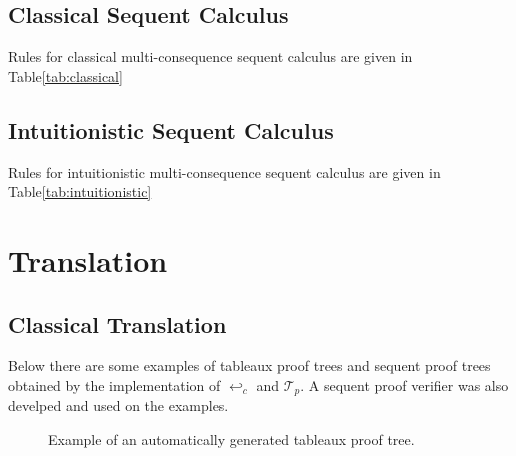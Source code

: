 \documentclass[runningheads]{llncs}
\begin{document}
\subsection {Classical Sequent Calculus}

\developmentSequentClassicalDefinition

Rules for classical multi-consequence sequent calculus are given in Table\ref{tab:classical}

\RulesClassicalSequentCalculus
\subsection {Intuitionistic Sequent Calculus}

\developmentSequentIntuitionisticDefinition

Rules for intuitionistic multi-consequence sequent calculus are given in Table\ref{tab:intuitionistic}


\RulesIntuitionisticSequentCalculus


\section{Translation}

\nodeTranslationFunction

\uselessTheorem

\subsection{Classical Translation}



\localTranslationValidityTheorem
    


\TranslationClassical

\TranslationClassicalProof



Below there are some examples of tableaux proof trees and sequent proof trees obtained by the 
implementation of $\hookleftarrow_c$ and $\mathcal{T}_p$. A 
sequent proof verifier was also develped and used on the examples.


\begin{figure}

    {\fontsize{1}{1}\selectfont
        \ocmalImageII

\caption{Example of an automatically generated tableaux proof tree.}
\label{fig:destructive_tableaux}
    }
\end{figure}
\end{document}
